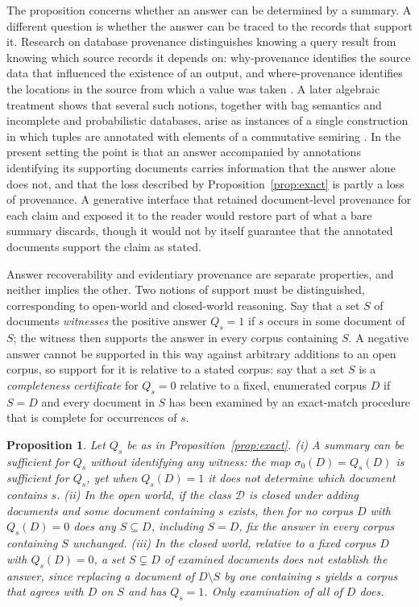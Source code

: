 \documentclass[11pt]{article}
\newtheorem{proposition}{Proposition}
\theoremstyle{remark}
\begin{document}
The proposition concerns whether an answer can be determined by a summary. A different question is whether the answer can be traced to the records that support it. Research on database provenance distinguishes knowing a query result from knowing which source records it depends on: why-provenance identifies the source data that influenced the existence of an output, and where-provenance identifies the locations in the source from which a value was taken \cite{buneman2001}. A later algebraic treatment shows that several such notions, together with bag semantics and incomplete and probabilistic databases, arise as instances of a single construction in which tuples are annotated with elements of a commutative semiring \cite{green2007}. In the present setting the point is that an answer accompanied by annotations identifying its supporting documents carries information that the answer alone does not, and that the loss described by Proposition~\ref{prop:exact} is partly a loss of provenance. A generative interface that retained document-level provenance for each claim and exposed it to the reader would restore part of what a bare summary discards, though it would not by itself guarantee that the annotated documents support the claim as stated.

Answer recoverability and evidentiary provenance are separate properties, and neither implies the other. Two notions of support must be distinguished, corresponding to open-world and closed-world reasoning. Say that a set $S$ of documents \emph{witnesses} the positive answer $Q_s=1$ if $s$ occurs in some document of $S$; the witness then supports the answer in every corpus containing $S$. A negative answer cannot be supported in this way against arbitrary additions to an open corpus, so support for it is relative to a stated corpus: say that a set $S$ is a \emph{completeness certificate} for $Q_s=0$ relative to a fixed, enumerated corpus $D$ if $S=D$ and every document in $S$ has been examined by an exact-match procedure that is complete for occurrences of $s$.

\begin{proposition}\label{prop:support}
Let $Q_s$ be as in Proposition~\ref{prop:exact}. (i) A summary can be sufficient for $Q_s$ without identifying any witness: the map $\sigma_0(D)=Q_s(D)$ is sufficient for $Q_s$, yet when $Q_s(D)=1$ it does not determine which document contains $s$. (ii) In the open world, if the class $\mathcal{D}$ is closed under adding documents and some document containing $s$ exists, then for no corpus $D$ with $Q_s(D)=0$ does any $S\subseteq D$, including $S=D$, fix the answer in every corpus containing $S$ unchanged. (iii) In the closed world, relative to a fixed corpus $D$ with $Q_s(D)=0$, a set $S\subsetneq D$ of examined documents does not establish the answer, since replacing a document of $D\setminus S$ by one containing $s$ yields a corpus that agrees with $D$ on $S$ and has $Q_s=1$. Only examination of all of $D$ does.
\end{proposition}
\end{document}
